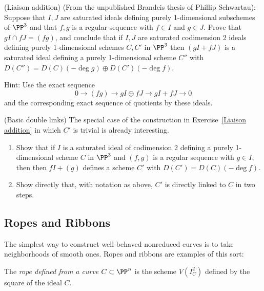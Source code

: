 \begin{exercise} (Liaison addition)\label{Liaison addition}
(From the unpublished Brandeis thesis of Phillip Schwartau):
Suppose that $I, J$ are saturated ideals defining purely 1-dimensional subschemes of $\PP^3$
and that $f,g$ is a regular sequence with $f\in I$ and $g\in J$.
Prove that $g I \cap fJ = (fg)$, and conclude that if $I,J$ are saturated codimension 2 ideals
 defining purely 1-dimensional schemes $C,C'$ in $\PP^3$
 then  $(gI+fJ)$ is a saturated ideal defining a purely 1-dimensional
scheme $C''$ with $D(C'') = D(C)(-\deg g) \oplus D(C')(-\deg f)$.

Hint: Use the exact sequence 
$$
0\to (fg) \to gI \oplus fJ \to gI+fJ \to 0
$$
and the corresponding exact sequence of quotients by these ideals.
\end{exercise}


\begin{exercise}(Basic double links)\label{Basic double links}
The special case of the construction in Exercise~\ref{Liaison addition} in which $C'$ is trivial is already interesting. 

\begin{enumerate}
 \item Show that if $I$ is a saturated ideal of codimension 2
 defining a purely 1-dimensional scheme $C$ in $\PP^3$
 and $(f, g)$ is a regular sequence with $g\in I$, then
 then  $fI+(g)$ defines a scheme $C'$ with $D(C') = D(C)(-\deg f)$.

 \item Show directly that, with notation as above, $C'$ is directly linked to $C$
 in two steps. %
 \end{enumerate}

\end{exercise}

\subsection{Ropes and Ribbons}
The simplest way to construct well-behaved nonreduced curves is
to take neighborhoods of smooth ones. Ropes and ribbons are examples of this sort:


\begin{definition}
The \emph{rope defined from a curve $C \subset \PP^n$} is the scheme $V(I^2_C)$ defined by the square of the ideal $C$.
\end{definition}

